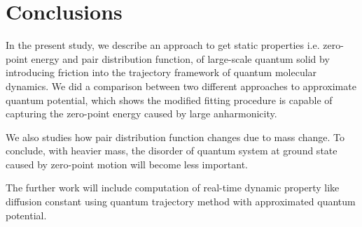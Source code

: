 \documentclass[11pt,letter,nocenter]{revtex4-1}
\begin{document}
\section{Conclusions} 
In the present study, we describe an approach to get static properties i.e. zero-point energy and pair distribution function, of large-scale quantum solid by introducing friction into the trajectory framework of quantum molecular dynamics. We did a comparison between two different approaches to approximate quantum potential, which shows the modified fitting procedure is capable of capturing the zero-point energy caused by large anharmonicity. 
 
We also studies  how pair distribution function changes due to mass change. To conclude, with heavier mass, the disorder of quantum system at ground state caused by zero-point motion will become less important.  

The further work will include computation of real-time dynamic property like diffusion constant using quantum trajectory method with approximated quantum potential.   






\newpage



\end{document}
